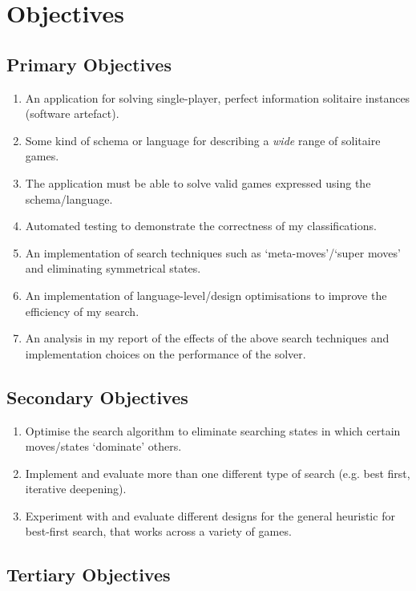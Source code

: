 \documentclass{article}
\begin{document}
\section{Objectives}

\subsection{Primary Objectives}

\begin{enumerate}
	\item An application for solving single-player, perfect information solitaire
instances (software artefact).
	\item Some kind of schema or language for describing a \emph{wide} range of
solitaire games.
	\item The application must be able to solve valid games expressed using the
schema/language.
	\item Automated testing to demonstrate the correctness of my classifications.
	\item An implementation of search techniques such as `meta-moves'/`super
moves'\cite{SolLab} and eliminating symmetrical states.
	\item An implementation of language-level/design optimisations to improve the
efficiency of my search.
	\item An analysis in my report of the effects of the above search techniques
and implementation choices on the performance of the solver.
\end{enumerate}

\subsection{Secondary Objectives}

\begin{enumerate}
	\item Optimise the search algorithm to eliminate searching states in which
certain moves/states `dominate'\cite{WikDom} others.
	\item Implement and evaluate more than one different type of search (e.g.
best first, iterative deepening).
	\item Experiment with and evaluate different designs for the general
heuristic for best-first search, that works across a variety of games.
\end{enumerate}

\subsection{Tertiary Objectives}
\end{document}
